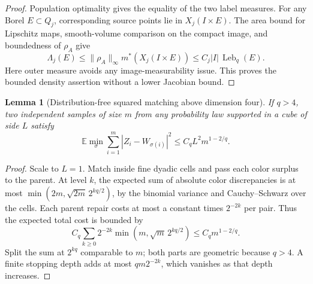 \documentclass[11pt,reqno]{amsart}
\newtheorem{lemma}[theorem]{Lemma}
\theoremstyle{definition}
\theoremstyle{remark}
\numberwithin{equation}{section}
\newcommand{\E}{\mathbb E}
\begin{document}
\begin{proof}
Population optimality gives the equality of the two label measures.
For any Borel \(E\subset Q_j\), corresponding source points lie in
\(X_j(I\times E)\). The area bound for Lipschitz maps, smooth-volume
comparison on the compact image, and boundedness of \(\rho_A\) give
\[
 \Lambda_j(E)\le \|\rho_A\|_\infty m^*(X_j(I\times E))
                   \le C_j|I|\,\operatorname{Leb}_q(E).
\]
Here outer measure avoids any image-measurability issue. This proves
the bounded density assertion without a lower Jacobian bound.
\end{proof}

\begin{lemma}[Distribution-free squared matching above dimension four]
\label{lem:general-upper-dyadic}
If \(q>4\), two independent samples of size \(m\) from any probability
law supported in a cube of side \(L\) satisfy
\[
 \E\min_\sigma\sum_{i=1}^m|Z_i-W_{\sigma(i)}|^2
       \le C_qL^2m^{1-2/q}.
\]
\end{lemma}

\begin{proof}
Scale to \(L=1\). Match inside fine dyadic cells and pass each color
surplus to the parent. At level \(k\), the expected sum of absolute
color discrepancies is at most
\(\min(2m,\sqrt{2m}\,2^{kq/2})\), by the binomial variance and
Cauchy--Schwarz over the cells. Each parent repair costs at most a
constant times \(2^{-2k}\) per pair. Thus the expected total cost is
bounded by
\[
 C_q\sum_{k\ge0}2^{-2k}
             \min(m,\sqrt m\,2^{kq/2})
       \le C_qm^{1-2/q}.
\]
Split the sum at \(2^{kq}\) comparable to \(m\); both parts are
geometric because \(q>4\). A finite stopping depth adds at most
\(qm2^{-2k}\), which vanishes as that depth increases.
\end{proof}
\end{document}
